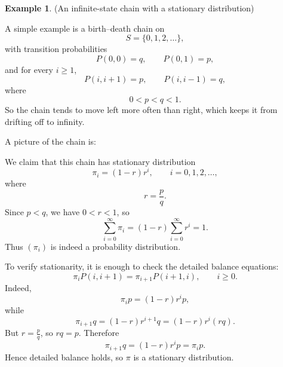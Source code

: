 \documentclass[11pt]{article}
\theoremstyle{definition}
\newtheorem{example}[theorem]{Example}
\begin{document}
\begin{example}{(An infinite-state chain with a stationary distribution)}

A simple example is a birth--death chain on
\[
S=\{0,1,2,\dots\},
\]
with transition probabilities
\[
P(0,0)=q,\qquad P(0,1)=p,
\]
and for every \(i\ge 1\),
\[
P(i,i+1)=p,\qquad P(i,i-1)=q,
\]
where
\[
0<p<q<1.
\]
So the chain tends to move left more often than right, which keeps it from drifting off to infinity.

\medskip

\noindent
A picture of the chain is:

\begin{center}
\end{center}

\medskip

\noindent
We claim that this chain has stationary distribution
\[
\pi_i=(1-r)r^i,\qquad i=0,1,2,\dots,
\]
where
\[
r=\frac{p}{q}.
\]
Since \(p<q\), we have \(0<r<1\), so
\[
\sum_{i=0}^\infty \pi_i=(1-r)\sum_{i=0}^\infty r^i=1.
\]
Thus \((\pi_i)\) is indeed a probability distribution.

\medskip

\noindent
To verify stationarity, it is enough to check the detailed balance equations:
\[
\pi_i P(i,i+1)=\pi_{i+1}P(i+1,i),\qquad i\ge 0.
\]
Indeed,
\[
\pi_i p=(1-r)r^i p,
\]
while
\[
\pi_{i+1} q=(1-r)r^{i+1}q=(1-r)r^i(rq).
\]
But \(r=\frac{p}{q}\), so \(rq=p\). Therefore
\[
\pi_{i+1}q=(1-r)r^i p=\pi_i p.
\]
Hence detailed balance holds, so \(\pi\) is a stationary distribution.


\end{example}
\end{document}

